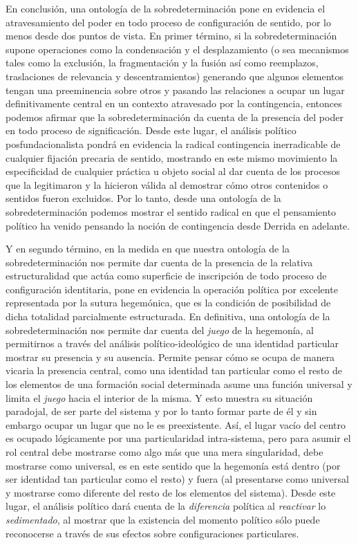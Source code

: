 \documentclass{book}
\begin{document}
En conclusión, una ontología de la sobredeterminación pone en evidencia
el atravesamiento del poder en todo proceso de configuración de sentido,
por lo menos desde dos puntos de vista. En primer término, si la
sobredeterminación supone operaciones como la condensación y el
desplazamiento (o sea mecanismos tales como la exclusión, la
fragmentación y la fusión así como reemplazos, traslaciones de
relevancia y descentramientos) generando que algunos elementos tengan
una preeminencia sobre otros y pasando las relaciones a ocupar un lugar
definitivamente central en un contexto atravesado por la contingencia,
entonces podemos afirmar que la sobredeterminación da cuenta de la
presencia del poder en todo proceso de significación. Desde este lugar,
el análisis político posfundacionalista pondrá en evidencia la radical
contingencia inerradicable de cualquier fijación precaria de sentido,
mostrando en este mismo movimiento la especificidad de cualquier
práctica u objeto social al dar cuenta de los procesos que la
legitimaron y la hicieron válida al demostrar cómo otros contenidos o
sentidos fueron excluidos. Por lo tanto, desde una ontología de la
sobredeterminación podemos mostrar el sentido radical en que el
pensamiento político ha venido pensando la noción de contingencia desde
Derrida en adelante.

Y en segundo término, en la medida en que nuestra ontología de la
sobredeterminación nos permite dar cuenta de la presencia de la relativa
estructuralidad que actúa como superficie de inscripción de todo proceso
de configuración identitaria, pone en evidencia la operación política
por excelente representada por la sutura hegemónica, que es la condición
de posibilidad de dicha totalidad parcialmente estructurada. En
definitiva, una ontología de la sobredeterminación nos permite dar
cuenta del \emph{juego} de la hegemonía, al permitirnos a través del
análisis político-ideológico de una identidad particular mostrar su
presencia y su ausencia. Permite pensar cómo se ocupa de manera vicaria
la presencia central, como una identidad tan particular como el resto de
los elementos de una formación social determinada asume una función
universal y limita el \emph{juego} hacia el interior de la misma. Y esto
muestra su situación paradojal, de ser parte del sistema y por lo tanto
formar parte de él y sin embargo ocupar un lugar que no le es
preexistente. Así, el lugar vacío del centro es ocupado lógicamente por
una particularidad intra-sistema, pero para asumir el rol central debe
mostrarse como algo más que una mera singularidad, debe mostrarse como
universal, es en este sentido que la hegemonía está dentro (por ser
identidad tan particular como el resto) y fuera (al presentarse como
universal y mostrarse como diferente del resto de los elementos del
sistema). Desde este lugar, el análisis político dará cuenta de la
\emph{diferencia} política al \emph{reactivar} lo \emph{sedimentado}, al
mostrar que la existencia del momento político sólo puede reconocerse a
través de sus efectos sobre configuraciones particulares.
\end{document}
